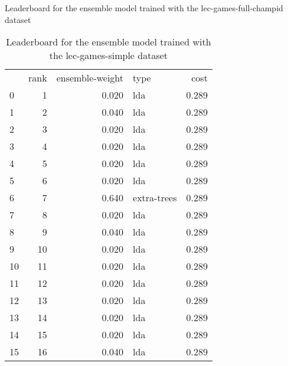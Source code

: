 \begin{table}[]
	\caption{Leaderboard for the ensemble model trained with the lec-games-full-champid dataset}
	\label{tab:lb-lec-games-full-champid-randsplit}
\end{table}

\begin{table}[]
	\centering
	\begin{tabular}{lrrlr}
		   & rank & ensemble-weight & type        & cost  \\
		0  & 1    & 0.020           & lda         & 0.289 \\
		1  & 2    & 0.040           & lda         & 0.289 \\
		2  & 3    & 0.020           & lda         & 0.289 \\
		3  & 4    & 0.020           & lda         & 0.289 \\
		4  & 5    & 0.020           & lda         & 0.289 \\
		5  & 6    & 0.020           & lda         & 0.289 \\
		6  & 7    & 0.640           & extra-trees & 0.289 \\
		7  & 8    & 0.020           & lda         & 0.289 \\
		8  & 9    & 0.040           & lda         & 0.289 \\
		9  & 10   & 0.020           & lda         & 0.289 \\
		10 & 11   & 0.020           & lda         & 0.289 \\
		11 & 12   & 0.020           & lda         & 0.289 \\
		12 & 13   & 0.020           & lda         & 0.289 \\
		13 & 14   & 0.020           & lda         & 0.289 \\
		14 & 15   & 0.020           & lda         & 0.289 \\
		15 & 16   & 0.040           & lda         & 0.289 \\
	\end{tabular}

	\caption{Leaderboard for the ensemble model trained with the lec-games-simple dataset}
	\label{tab:lb-lec-games-simple-autoencode}
\end{table}

